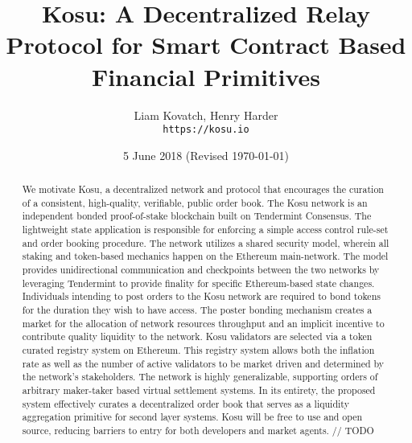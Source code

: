 \documentclass[9pt]{article}
\begin{document}
\title{ \textbf{Kosu: A Decentralized Relay Protocol for Smart Contract Based Financial Primitives} } 
\author{Liam Kovatch, Henry Harder \\\texttt{https://kosu.io}}
\date{5 June 2018 (Revised \today)}
\maketitle 


\begin{abstract}

\noindent We motivate Kosu, a decentralized network and protocol that encourages the curation of a consistent, high-quality, verifiable, public order book. The Kosu network is an independent bonded proof-of-stake blockchain built on Tendermint Consensus. The lightweight state application is responsible for enforcing a simple access control rule-set and order booking procedure. The network utilizes a shared security model, wherein all staking and token-based mechanics happen on the Ethereum main-network. The model provides unidirectional communication and checkpoints between the two networks by leveraging Tendermint to provide finality for specific Ethereum-based state changes. Individuals intending to post orders to the Kosu network are required to bond tokens for the duration they wish to have access. The poster bonding mechanism creates a market for the allocation of network resources throughput and an implicit incentive to contribute quality liquidity to the network. Kosu validators are selected via a token curated registry system on Ethereum. This registry system allows both the inflation rate as well as the number of active validators to be market driven and determined by the network’s stakeholders. The network is highly generalizable, supporting orders of arbitrary maker-taker based virtual settlement systems. In its entirety, the proposed system effectively curates a decentralized order book that serves as a liquidity aggregation primitive for second layer systems. Kosu will be free to use and open source, reducing barriers to entry for both developers and market agents. // TODO
\medskip

\end{abstract}
\pagebreak
\end{document}

